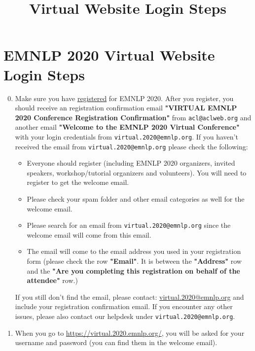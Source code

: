\documentclass[11pt]{scrartcl}
\title{\conferenceName Virtual Website Login Steps}
\makeatletter
\newcommand{\conferenceName}{EMNLP 2020\xspace}
\newcommand{\registrationUrl}{https://aclweb.org/conference/virtual-emnlp-2020-conference-registration/}
\newcommand{\virtualConferenceUrl}{https://virtual.2020.emnlp.org/}
\newcommand{\loginCredentialEmail}{virtual.2020@emnlp.org}
\newcommand{\helpdeskEmail}{virtual.2020@emnlp.org}
\makeatother
\begin{document}
\section*{\conferenceName Virtual Website Login Steps}
	
\begin{enumerate}
	\setcounter{enumi}{-1}
	\item
		\label{step:registration}
		\begin{sloppypar}
			Make sure you have \href{\registrationUrl}{registered} for \conferenceName. After you register, you should receive an registration confirmation email \textbf{"VIRTUAL \conferenceName Conference Registration Confirmation"} from \nolinkurl{acl@aclweb.org} and another email \textbf{"Welcome to the \conferenceName Virtual Conference"} with your login credentials from \nolinkurl{\loginCredentialEmail}. If you haven't received the email from \nolinkurl{\loginCredentialEmail} please check the following:
			
			\begin{itemize}
				\item Everyone should register (including \conferenceName organizers, invited speakers, workshop/tutorial organizers and volunteers). You will need to register to get the welcome email.
				\item Please check your spam folder and other email categories as well for the welcome email.
				\item Please search for an email from \nolinkurl{\loginCredentialEmail} since the welcome email will come from this email.
				\item The email will come to the email address you used in your registration form (please check the row \textbf{"Email"}. It is between the \textbf{"Address"} row and the \textbf{"Are you completing this registration on behalf of the attendee"} row.)
			\end{itemize}
		
			If you still don't find the email, please contact: \href{mailto:\helpdeskEmail}{\helpdeskEmail} and include your registration confirmation email. If you encounter any other issues, please also contact our helpdesk under \nolinkurl{\loginCredentialEmail}.
		\end{sloppypar}
	\item
		\begin{sloppypar}
			When you go to \url{\virtualConferenceUrl}, you will be asked for your username and password (you can find them in the welcome email).
			

\end{sloppypar}
\end{enumerate}
\end{document}
